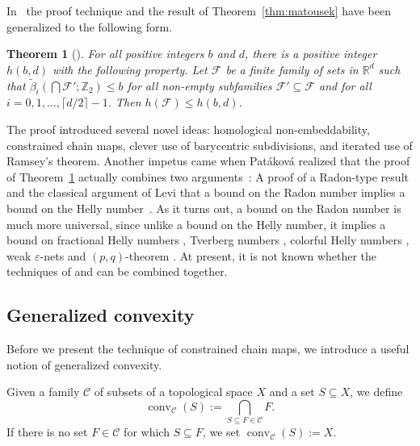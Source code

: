 \documentclass[a4paper,12pt]{amsart}
\newcommand{\R}{\mathbb{R}} 	%
\newtheorem{theorem}{Theorem}
\theoremstyle{definition}
\begin{document}
In~\cite{hb17} the proof technique and the result of Theorem~\ref{thm:matousek} have been generalized to the following form.
\begin{theorem}[\cite{hb17}]\label{thm:hellyBetti}
 For all positive integers $b$ and $d$, there is a positive integer $h(b,d)$ with the following property.
 Let $\mathcal F$ be a finite family of sets in $\R^d$ such that $\widetilde{\beta}_i\left(\bigcap \mathcal F'; \mathbb Z_2\right)\leq b$ for all non-empty subfamilies $\mathcal F' \subseteq \mathcal F$ and for all $i=0,1,\ldots, \lceil d/2\rceil-1$. Then $h(\mathcal F)\leq h(b,d)$.
\end{theorem}
The proof introduced several novel ideas: homological non-embeddability, constrained chain maps, clever use of barycentric subdivisions, and iterated use of Ramsey's theorem. 
Another impetus came when Patáková realized that the proof of Theorem~\ref{thm:hellyBetti} actually combines two arguments~\cite{bettiRadon}: A proof of a Radon-type result and the classical argument of Levi that a bound on the Radon number implies a bound on the Helly number~\cite{Levi1951}.
As it turns out, a bound on the Radon number is much more universal, since unlike a bound on the Helly number, it implies a bound on fractional Helly numbers \cite{boundedRadon_fractHelly}, Tverberg numbers \cite{jamison1981, Bukh, domotor}, colorful Helly numbers \cite{boundedRadon_fractHelly}, weak $\varepsilon$-nets and $(p,q)$-theorem \cite{transversal-hypergraph, boundedRadon_fractHelly}.
At present, it is not known whether the techniques of \cite{radonPolynomial} and \cite{hb17,bettiRadon} can be combined together. 


\subsection{Generalized convexity}
Before we present the technique of constrained chain maps, we introduce a useful notion of generalized convexity.

Given a family $\mathcal C$ of subsets of a topological space $X$ and a set $S\subseteq X$, we define
\[\operatorname{conv}_{\mathcal C}(S):=\bigcap_{S\subseteq F\in\mathcal C} F.\]
If there is no set $F\in\mathcal C$ for which $S\subseteq F$, we set $\operatorname{conv}_{\mathcal C}(S):=X$.
\end{document}
